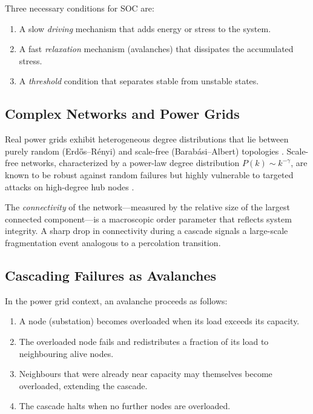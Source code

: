 \documentclass[12pt,a4paper]{article}
\begin{document}
Three necessary conditions for SOC are:
\begin{enumerate}[leftmargin=2em]
  \item A slow \textit{driving} mechanism that adds energy or stress to the system.
  \item A fast \textit{relaxation} mechanism (avalanches) that dissipates the accumulated stress.
  \item A \textit{threshold} condition that separates stable from unstable states.
\end{enumerate}

\subsection{Complex Networks and Power Grids}

Real power grids exhibit heterogeneous degree distributions that lie between purely random (Erd\H{o}s--R\'enyi) and scale-free (Barab\'asi--Albert) topologies \cite{albert2004}.
Scale-free networks, characterized by a power-law degree distribution $P(k) \sim k^{-\gamma}$, are known to be robust against random failures but highly vulnerable to targeted attacks on high-degree hub nodes \cite{barabasi1999}.

The \textit{connectivity} of the network---measured by the relative size of the largest connected component---is a macroscopic order parameter that reflects system integrity.
A sharp drop in connectivity during a cascade signals a large-scale fragmentation event analogous to a percolation transition.

\subsection{Cascading Failures as Avalanches}

In the power grid context, an avalanche proceeds as follows:
\begin{enumerate}[leftmargin=2em]
  \item A node (substation) becomes overloaded when its load exceeds its capacity.
  \item The overloaded node fails and redistributes a fraction of its load to neighbouring alive nodes.
  \item Neighbours that were already near capacity may themselves become overloaded, extending the cascade.
  \item The cascade halts when no further nodes are overloaded.
\end{enumerate}
\end{document}
